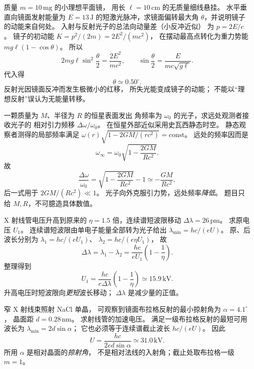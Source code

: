 质量 $m=10\,\mathrm{mg}$ 的小理想平面镜，
用长 $\ell=10\,\mathrm{cm}$ 的无质量细线悬挂。
水平垂直向镜面发射能量为 $E=13\,\mathrm J$
的短激光脉冲，求镜面偏转最大角
$\theta$，并说明镜子的动能来自何处。
\exsolution
入射与反射光子的总法向动量差（小反冲近似）
为 $p=2E/c$。
镜子的初动能
$K=p^2/(2m)=2E^2/(mc^2)$，
在摆动最高点转化为重力势能
$mg\ell(1-\cos\theta)$。
所以
\[
 2mg\ell\sin^2\frac\theta2
 =\frac{2E^2}{mc^2},\qquad
 \boxed{\sin\frac\theta2=\frac{E}{mc\sqrt{g\ell}}}.
\]
代入得
\[
 \boxed{\theta\simeq0.50^\circ}.
\]
\excheck 反射光因镜面反冲而发生极微小的红移，
所失光能变成镜子的动能；
不能以“理想反射”误认为无能量转移。


一颗质量为 $M$、半径为 $R$ 的恒星表面发出
角频率为 $\omega_0$ 的光子，求远处观测者接收光子的
相对引力频移 $\Delta\omega/\omega_0$。
\exsolution
在恒星外部近似采用史瓦西静态时空。
静态观察者测得的局部频率满足
$\omega(r)\sqrt{1-2GM/(rc^2)}=\mathrm{const}$。
远处的频率因而是
\[
 \omega_\infty=\omega_0\sqrt{1-\frac{2GM}{Rc^2}}.
\]
故
\[
 \boxed{\frac{\Delta\omega}{\omega_0}
 =\sqrt{1-\frac{2GM}{Rc^2}}-1
 \simeq-\frac{GM}{Rc^2}},
\]
后一式用于 $2GM/(Rc^2)\ll1$。
\excheck 光子向外克服引力势，远处频率\emph{降低}。
题目只给 $M,R$，不可臆造具体数值。

X 射线管电压升高到原来的
$\eta=1.5$ 倍，连续谱短波限移动
$\Delta\lambda=26\,\mathrm{pm}$。
求原电压 $U_1$。
\exsolution
连续谱短波限由单电子能量全部转为光子给出
$\lambda_{\min}=hc/(eU)$。
原、后波长分别为
$\lambda_1=hc/(eU_1)$、
$\lambda_2=hc/(e\eta U_1)$，
故
\[
 \Delta\lambda=\lambda_1-\lambda_2
 =\frac{hc}{eU_1}\left(1-\frac1\eta\right).
\]
整理得到
\[
 \boxed{U_1=\frac{hc}{e\Delta\lambda}
 \left(1-\frac1\eta\right)
 \simeq15.9\,\mathrm{kV}}.
\]
\excheck 升高电压时短波限向\emph{更短}波长移动；
$\Delta\lambda$ 是减少量的正值。

窄 X 射线束照射 NaCl 单晶，
可观察到镜面布拉格反射的最小掠射角为
$\alpha=4.1^\circ$，
晶面距 $d=0.28\,\mathrm{nm}$。
求射线管的加速电压。
\exsolution
满足一级布拉格反射的最短可用波长为
$\lambda_{\min}=2d\sin\alpha$；
它也必须等于连续谱截止波长
$hc/(eU)$。
因此
\[
 \boxed{U=\frac{hc}{2ed\sin\alpha}
 \simeq31.0\,\mathrm{kV}}.
\]
\excheck 所用 $\alpha$ 是相对晶面的\emph{掠射角}，
不是相对法线的入射角；截止处取布拉格一级 $m=1$。

